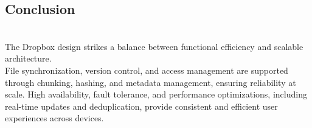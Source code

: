 \subsection{Conclusion}\label{fnoC6wElDKzhPVtx2B6Mq}
\\
The Dropbox design strikes a balance between functional efficiency and scalable architecture.
\\
File synchronization, version control, and access management are supported through chunking, hashing, and metadata management, ensuring reliability at scale. High availability, fault tolerance, and performance optimizations, including real-time updates and deduplication, provide consistent and efficient user experiences across devices.


